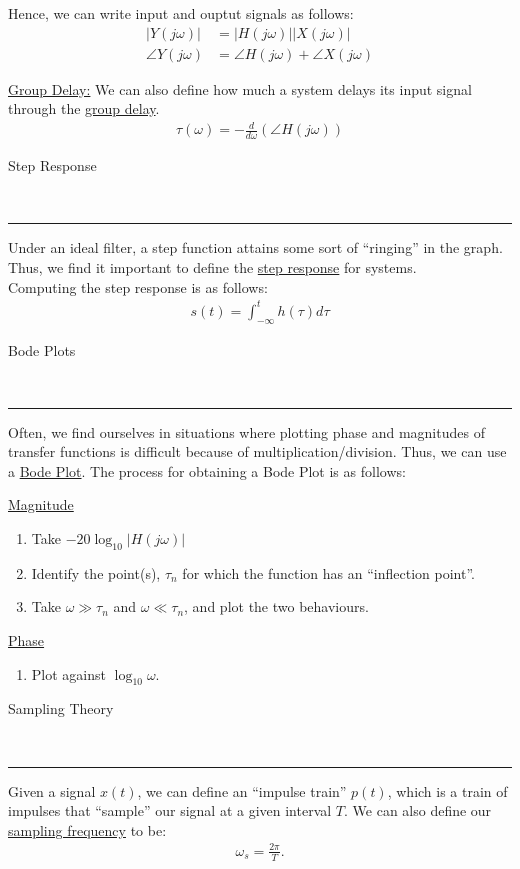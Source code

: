 \documentclass{article}
\newcommand{\sheader}[1]{\underline{#1:}}
\newcommand{\header}[1]{\begin{large}\noindent #1\end{large}\\\rule{\textwidth}{0.5pt}}
\newcommand{\gap}{\medskip\\}
\newcommand{\centertext}[1]{\begin{center}#1\end{center}}
\newcommand{\jomega}{{j\omega}}
\begin{document}
Hence, we can write input and ouptut signals as follows:
\begin{align*}
    |Y(\jomega)| &= |H(\jomega)||X(\jomega)| \\
    \angle Y(\jomega) &= \angle H(\jomega) + \angle X(\jomega)
\end{align*}

\sheader{Group Delay} We can also define how much a system delays its input signal
through the \underline{group delay}. 
\begin{align*}
    \tau(\omega) = -\frac{d}{d\omega} \left(\angle H(\jomega)\right)
\end{align*}

\header{Step Response}

Under an ideal filter, a step function attains some sort of ``ringing'' in the
graph. Thus, we find it important to define the \underline{step response}
for systems.
\gap
Computing the step response is as follows:
\begin{align*}
    s(t) = \int_{-\infty}^t h(\tau) d\tau
\end{align*}

\header{Bode Plots}

Often, we find ourselves in situations where plotting phase and magnitudes of transfer
functions is difficult because of multiplication/division. Thus, we can use a 
\underline{Bode Plot}. The process for obtaining a Bode Plot is as follows:

\begin{multicols}{2}
    \centertext{\underline{Magnitude}}
    \begin{enumerate}
        \item Take $-20\log_{10}|H(\jomega)|$
        \item Identify the point(s), $\tau_n$ for which the function has an 
        ``inflection point''.
        \item Take $\omega \gg \tau_n$ and $\omega \ll \tau_n$, and plot 
        the two behaviours.
    \end{enumerate}
    \vfill\null\columnbreak
    \centertext{\underline{Phase}}
    \begin{enumerate}
        \item Plot against $\log_{10}\omega$.
    \end{enumerate}
\end{multicols}

\pagebreak

\header{Sampling Theory}
Given a signal $x(t)$, we can define an ``impulse train'' $p(t)$, which is a train
of impulses that ``sample'' our signal at a given interval $T$. We can also
define our \underline{sampling frequency} to be:
\begin{align*}
    \omega_s = \frac{2\pi}{T}.
\end{align*}
\end{document}
